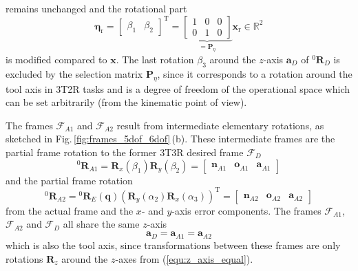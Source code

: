 \documentclass{svproc}
\newcommand{\bm}[1]{\boldsymbol{#1}}
\newcommand{\vek}[3]{\boldsymbol{#1}^{#2}_{#3}}
\newcommand{\rotmat}[2]{{{ }^{#1}\boldsymbol{R}}_{#2}}
\newcommand{\transp}[0]{{\mathrm{T}}}
\newcommand{\ks}[1]{{\mathcal{F}}_{#1}}
\begin{document}
%
remains unchanged and the rotational part
%
\begin{equation}
\bm{\eta}_{\mathrm{r}}
=
\begin{bmatrix}
\beta_1  & \beta_2
\end{bmatrix}^\transp
=
\underbrace{\begin{bmatrix}
1 & 0 & 0  \\ 
0 & 1 & 0
\end{bmatrix}}_{=\bm{P}_{\eta}}
\bm{x}_{\mathrm{r}}
\in {\mathbb{R}}^{2}
\label{equ:etar_def}
\end{equation}
%
is modified compared to $\bm{x}$.
The last rotation $\beta_3$ around the $z$-axis $\bm{a}_{D}$ of $\rotmat{0}{D}$ is excluded by the selection matrix $\bm{P}_{\eta}$, since it corresponds to a rotation around the tool axis in 3T2R tasks and is a degree of freedom of the operational space which can be set arbitrarily (from the kinematic point of view).

The frames $\ks{A1}$ and $\ks{A2}$ result from intermediate elementary rotations, as sketched in Fig.\,\ref{fig:frames_5dof_6dof}\,(b).
These intermediate frames are the partial frame rotation to the former 3T3R desired frame $\ks{D}$
%
\begin{equation}
\rotmat{0}{A1} 
= 
\bm{R}_x(\beta_1) \bm{R}_y(\beta_2)
=
\begin{bmatrix}
\vek{n}{}{A1} & \vek{o}{}{A1} & \vek{a}{}{A1}
\end{bmatrix}
\end{equation}
%
and the partial frame rotation
%
\begin{equation}
\rotmat{0}{A2} 
= 
\rotmat{0}{E}(\bm{q})
\left(\bm{R}_y(\alpha_2) \bm{R}_x(\alpha_3)\right)^\transp 
=
\begin{bmatrix}
\vek{n}{}{A2} & \vek{o}{}{A2} & \vek{a}{}{A2}
\end{bmatrix}
\end{equation}
%
from the actual frame and the $x$- and $y$-axis error components.
%
The frames $\ks{A1}$, $\ks{A2}$ and $\ks{D}$ all share the same $z$-axis
%
\begin{equation}
\vek{a}{}{D}
=
\vek{a}{}{A1}
=
\vek{a}{}{A2}
\label{equ:z_axis_equal}
\end{equation}
%
which is also the tool axis, since transformations between these frames are only rotations $\bm{R}_z$ around the $z$-axes from (\ref{equ:z_axis_equal}).
\end{document}
